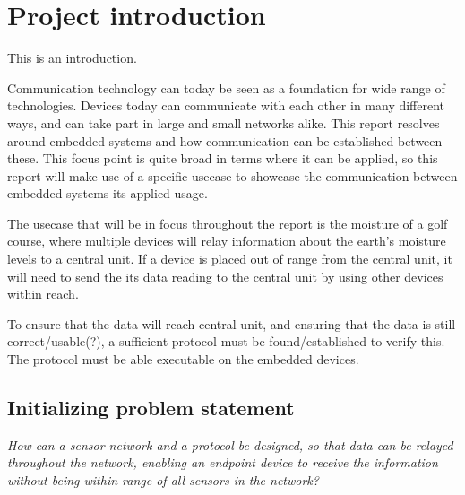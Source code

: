 \chapter{Project introduction}
This is an introduction.


Communication technology can today be seen as a foundation for wide range of technologies. Devices today can communicate with each other in many different ways, and can take part in large and small networks alike.
%
This report resolves around embedded systems and how communication can be established between these. This focus point is quite broad in terms where it can be applied, so this report will make use of a specific usecase to showcase the communication between embedded systems its applied usage.

The usecase that will be in focus throughout the report is the moisture of a golf course, where multiple devices will relay information about the earth's moisture levels to a central unit. If a device is placed out of range from the central unit, it will need to send the its data reading to the central unit by using other devices within reach.

To ensure that the data will reach central unit, and ensuring that the data is still correct/usable(?), a sufficient protocol must be found/established to verify this. The protocol must be able executable on the embedded devices.




\section{Initializing problem statement}


\textit{How can a sensor network and a protocol be designed, so that data can be relayed throughout the network, enabling an endpoint device to receive the information without being within range of all sensors in the network?}

